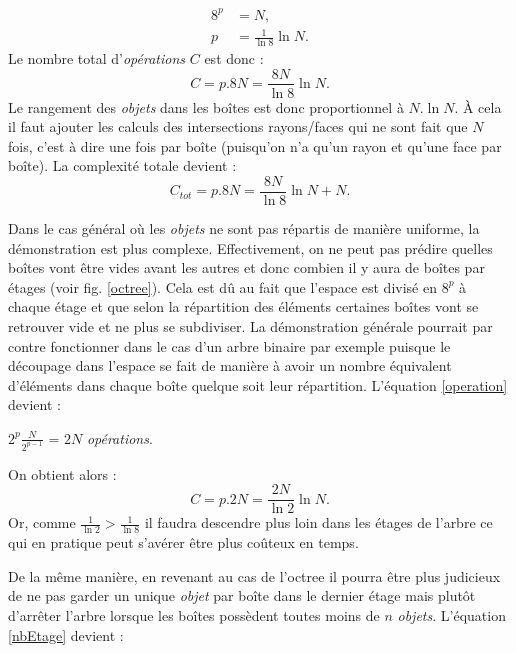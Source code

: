 \begin{align}  \label{nbEtage}
8^p &= N \nonumber, \\
p &= \frac{1}{\ln{8}}\ln{N}.
\end{align}
%
Le nombre total d'\textit{opérations} $C$ est donc :
\begin{equation}
C = p.8N = \frac{8N}{\ln8}\ln{N}.
\end{equation}
Le rangement des \textit{objets} dans les boîtes est donc proportionnel à $N.\ln{N}$. À cela il faut ajouter les calculs des intersections rayons/faces qui ne sont fait que $N$ fois, c'est à dire une fois par boîte (puisqu'on n'a qu'un rayon et qu'une face par boîte). La complexité totale devient :
\begin{equation}
C_{tot} = p.8N = \frac{8N}{\ln8}\ln{N} + N.
\end{equation}

Dans le cas général où les \textit{objets} ne sont pas répartis de manière uniforme, la démonstration est plus complexe. Effectivement, on ne peut pas prédire quelles boîtes vont être vides avant les autres et donc combien il y aura de boîtes par étages (voir fig. \ref{octree}). Cela est dû au fait que l'espace est divisé en $8^p$ à chaque étage et que selon la répartition des éléments certaines boîtes vont se retrouver vide et ne plus se subdiviser. La démonstration générale pourrait par contre fonctionner dans le cas d'un arbre binaire par exemple puisque le découpage dans l'espace se fait de manière à avoir un nombre équivalent d'éléments dans chaque boîte quelque soit leur répartition. L'équation \ref{operation} devient :

\begin{center}
$2^p\frac{N}{2^{p-1}}$ = $2N$ \textit{opérations}.
\end{center}
On obtient alors :
\begin{equation}
C = p.2N = \frac{2N}{\ln2}\ln{N}.
\end{equation} 
Or, comme $\frac{1}{\ln2} > \frac{1}{\ln8}$ il faudra descendre plus loin dans les étages de l'arbre ce qui en pratique peut s'avérer être plus coûteux en temps.

De la même manière, en revenant au cas de l'\gls{octree} il pourra être plus judicieux de ne pas garder un unique \textit{objet} par boîte dans le dernier étage mais plutôt d'arrêter l'arbre lorsque les boîtes possèdent toutes moins de $n$ \textit{objets}. L'équation \ref{nbEtage} devient :

